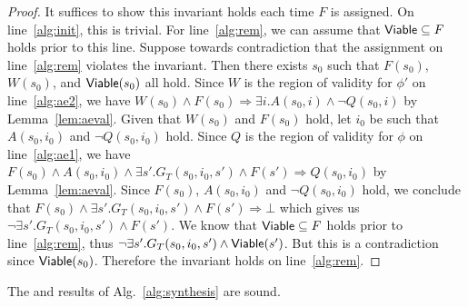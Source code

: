 \begin{proof}
  It suffices to show this invariant holds each time $F$ is assigned.
  On line~\ref{alg:init}, this is trivial. For line~\ref{alg:rem}, we can assume that
  ${\mathsf {Viable}} \subseteq F$ holds prior to this line. Suppose towards
  contradiction that the assignment on line~\ref{alg:rem} violates the invariant.
  Then there exists $s_0$ such that $F(s_0)$, $W(s_0)$, and
  ${\mathsf {Viable}}(s_0)$ all hold. Since $W$ is the region of validity for
  $\phi'$ on line~\ref{alg:ae2}, we have
  $W(s_0) \land F(s_0) \Rightarrow \exists i. A(s_0, i) \land \neg Q(s_0, i)$
  by Lemma~\ref{lem:aeval}. Given that $W(s_0)$ and $F(s_0)$ hold, let $i_0$
  be such that $A(s_0, i_0)$ and $\neg Q(s_0, i_0)$ hold. Since $Q$ is the
  region of validity for $\phi$ on line~\ref{alg:ae1}, we have
  $F(s_0) \land A(s_0, i_0) \land \exists s'. G_T(s_0, i_0, s') \land F(s') \Rightarrow Q(s_0, i_0)$
  by Lemma~\ref{lem:aeval}.
  Since $F(s_0)$, $A(s_0, i_0)$ and $\neg Q(s_0, i_0)$ hold, we conclude that
  $F(s_0) \land \exists s'. G_T(s_0, i_0, s') \land F(s') \Rightarrow \bot$ which
  gives us $\neg \exists s'. G_T(s_0, i_0, s') \land F(s')$.
  We know that
  ${\mathsf {Viable}} \subseteq F$ holds prior to line~\ref{alg:rem}, thus
  $\neg \exists s'. G_T(s_0, i_0, s') \land {\mathsf {Viable}}(s')$. But this is a
  contradiction since ${\mathsf {Viable}}(s_0)$. Therefore the invariant holds on
  line~\ref{alg:rem}.
\end{proof}


\begin{theorem}
  The \realizable and \unrealizable results of
  Alg.~\ref{alg:synthesis} are sound.
\end{theorem}



